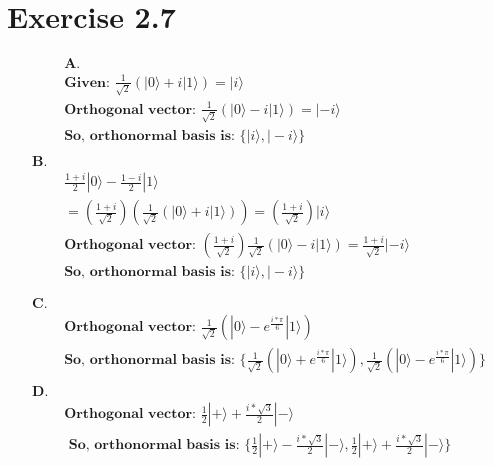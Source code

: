 \documentclass{article}
\def\ket#1{|#1\rangle}
\begin{document}
\section{ Exercise 2.7 }
\begin{align*}
&\textbf{A. } \\ 
    &\textbf{Given: }\frac{1}{\sqrt{2}}(\ket{0} + i\ket{1}) = \ket{i} \\ 
    &\textbf{Orthogonal vector: } \frac{1}{\sqrt{2}}(\ket{0} - i\ket{1}) = \ket{-i} \\ 
    &\textbf{So, orthonormal basis is: } \{ \ket{i}, \ket{-i} \} \\ \\ 
    \textbf{B. } \\ 
    &\frac{1 + i}{2}\ket{0} - \frac{1 - i}{2}\ket{1} \\ 
    &= (\frac{1 + i}{\sqrt{2}})(\frac{1}{\sqrt{2}}(\ket{0} + i\ket{1})) = (\frac{1 + i}{\sqrt{2}})\ket{i} \\ 
    &\textbf{Orthogonal vector: } (\frac{1 + i}{\sqrt{2}})\frac{1}{\sqrt{2}}(\ket{0} - i\ket{1}) = \frac{1 + i}{\sqrt{2}}\ket{-i} \\
    &\textbf{So, orthonormal basis is: } \{ \ket{i}, \ket{-i} \} \\ \\
    \\ \textbf{C. } \\ 
    &\textbf{Orthogonal vector: } \frac{1}{\sqrt{2}}(\ket{0} - e^{\frac{i*\pi}{6}}\ket{1})\\
    &\textbf{So, orthonormal basis is: } \{ \frac{1}{\sqrt{2}}(\ket{0} + e^{\frac{i*\pi}{6}}\ket{1}), \frac{1}{\sqrt{2}}(\ket{0} - e^{\frac{i*\pi}{6}}\ket{1})\} \\ \\
    \textbf{D. } \\ 
    & \textbf{Orthogonal vector: } \frac{1}{2}\ket{+} + \frac{i*\sqrt{3}}{2}\ket{-} \\ 
    & \textbf{ So, orthonormal basis is: } \{ \frac{1}{2}\ket{+} - \frac{i*\sqrt{3}}{2}\ket{-}, \frac{1}{2}\ket{+} + \frac{i*\sqrt{3}}{2}\ket{-}\} 
\end{align*}
\end{document}
